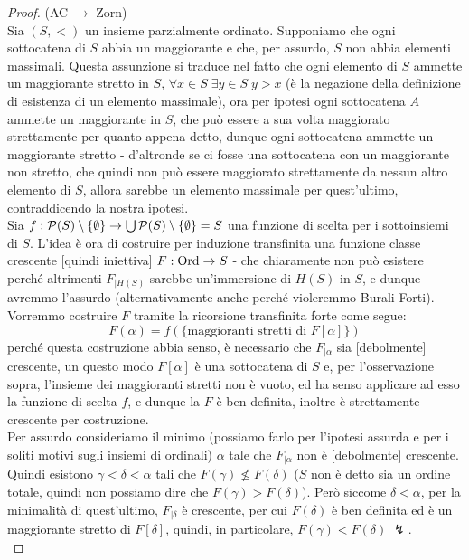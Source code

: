 \begin{proof}
	(AC $\rightarrow$ Zorn)\\
	Sia $(S,<)$ un insieme parzialmente ordinato. Supponiamo che ogni sottocatena di $S$ abbia un maggiorante e che, per assurdo, $S$ non abbia elementi massimali.
	Questa assunzione si traduce nel fatto che ogni elemento di $S$ ammette un maggiorante stretto in $S$, $\forall x \in S \; \exists y \in S \; y > x$ (è la negazione della definizione di esistenza di un elemento massimale), ora per ipotesi ogni sottocatena $A$ ammette un maggiorante in $S$, che può essere a sua volta maggiorato strettamente per quanto appena detto,
	dunque ogni sottocatena ammette un maggiorante stretto - d'altronde se ci fosse una sottocatena con un maggiorante non stretto, che quindi non può essere maggiorato strettamente da nessun altro elemento di $S$, allora sarebbe un elemento massimale per quest'ultimo, contraddicendo la nostra ipotesi.\\
	Sia $f : \mathcal{P}(S) \setminus \{\emptyset\} \to \bigcup \mathcal{P}(S) \setminus \{\emptyset\} = S$ una funzione di scelta per i sottoinsiemi di $S$. L'idea è ora di costruire per induzione transfinita una funzione classe crescente [quindi iniettiva] $F : \operatorname{Ord} \to S$ - che chiaramente non può esistere 
	perché altrimenti $F_{|H(S)}$ sarebbe un'immersione di $H(S)$ in $S$, e dunque avremmo l'assurdo (alternativamente anche perché violeremmo Burali-Forti). Vorremmo costruire $F$ tramite la ricorsione transfinita forte come segue:
	\[ F(\alpha) = f(\{\text{maggioranti stretti di $F[\alpha]$}\})
		\]
	perché questa costruzione abbia senso, è necessario che $F_{|\alpha}$ sia [debolmente] crescente, un questo modo $F[\alpha]$ è una sottocatena di $S$ e, per l'osservazione sopra, l'insieme dei maggioranti stretti non è vuoto, ed ha senso applicare ad esso la funzione di scelta $f$, e dunque la $F$ è ben definita,
	inoltre è strettamente crescente per costruzione.\\
	Per assurdo consideriamo il minimo (possiamo farlo per l'ipotesi assurda e per i soliti motivi sugli insiemi di ordinali) $\alpha$ tale che $F_{|\alpha}$ non è [debolmente] crescente. Quindi esistono $\gamma < \delta < \alpha$ tali che $F(\gamma) \not \leq F(\delta)$ ($S$ non è detto sia un ordine totale,
	quindi non possiamo dire che $F(\gamma) > F(\delta)$). Però siccome $\delta < \alpha$, per la minimalità di quest'ultimo, $F_{|\delta}$ è crescente, per cui $F(\delta)$ è ben definita
	ed è un maggiorante stretto di $F[\delta]$, quindi, in particolare, $F(\gamma) < F(\delta) \; \lightning$.\\

\end{proof}
